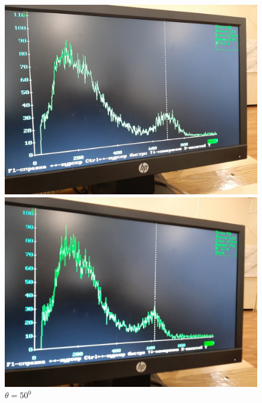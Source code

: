 \documentclass[a4paper, 12pt]{article}
\begin{document}
\begin{figure}[h]
\begin{minipage}[h]{0.3\linewidth}
\includegraphics[width = 1\linewidth]{40.jpg}
\caption{$\theta = 40^0$}
\end{minipage}
\hfill
\begin{minipage}[h]{0.3\linewidth}
\includegraphics[width = 1\linewidth]{50.jpg}
\caption{$\theta = 50^0$}
\end{minipage}
\hfill
\begin{minipage}[h]{0.3\linewidth}

\end{minipage}
\end{figure}
\end{document}
